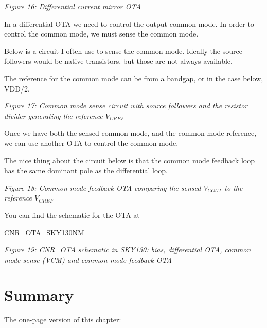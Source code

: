 {
\centering
{}
}

\emph{Figure 16: Differential current mirror OTA}

In a differential OTA we need to control the output common mode. In
order to control the common mode, we must sense the common mode.

Below is a circuit I often use to sense the common mode. Ideally the
source followers would be native transistors, but those are not always
available.

The reference for the common mode can be from a bandgap, or in the case
below, VDD/2.


{
\centering
{}
}

\emph{Figure 17: Common mode sense circuit with source followers and the
resistor divider generating the reference \(V_{CREF}\)}

Once we have both the sensed common mode, and the common mode reference,
we can use another OTA to control the common mode.

The nice thing about the circuit below is that the common mode feedback
loop has the same dominant pole as the differential loop.


{
\centering
{}
}

\emph{Figure 18: Common mode feedback OTA comparing the sensed
\(V_{COUT}\) to the reference \(V_{CREF}\)}

You can find the schematic for the OTA at

\href{https://github.com/wulffern/cnr_ota_sky130nm}{CNR\_OTA\_SKY130NM}


{
\centering
{}
}

\emph{Figure 19: CNR\_OTA schematic in SKY130: bias, differential OTA,
common mode sense (VCM) and common mode feedback OTA}

\section{Summary}\label{summary}

The one-page version of this chapter:


